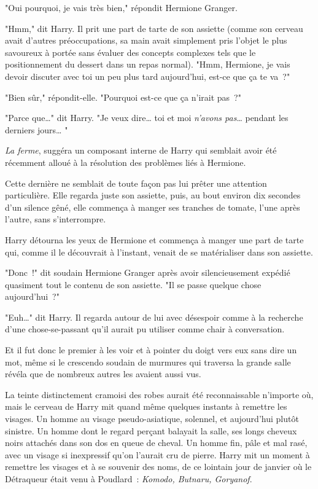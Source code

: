 "Oui pourquoi, je vais très bien," répondit Hermione Granger.

"Hmm," dit Harry. Il prit une part de tarte de son assiette (comme son cerveau avait d'autres préoccupations, sa main avait simplement pris l'objet le plus savoureux à portée sans évaluer des concepts complexes tels que le positionnement du dessert dans un repas normal). "Hmm, Hermione, je vais devoir discuter avec toi un peu plus tard aujourd'hui, est-ce que ça te va~?"

"Bien sûr," répondit-elle. "Pourquoi est-ce que ça n'irait pas~?"

"Parce que…" dit Harry. "Je veux dire… toi et moi \emph{n'avons pas}… pendant les derniers jours… "

\emph{La ferme}, suggéra un composant interne de Harry qui semblait avoir été récemment alloué à la résolution des problèmes liés à Hermione.

Cette dernière ne semblait de toute façon pas lui prêter une attention particulière. Elle regarda juste son assiette, puis, au bout environ dix secondes d'un silence gêné, elle commença à manger ses tranches de tomate, l'une après l'autre, sans s'interrompre.

Harry détourna les yeux de Hermione et commença à manger une part de tarte qui, comme il le découvrait à l'instant, venait de se matérialiser dans son assiette.

"Donc~!" dit soudain Hermione Granger après avoir silencieusement expédié quasiment tout le contenu de son assiette. "Il se passe quelque chose aujourd'hui~?"

"Euh…" dit Harry. Il regarda autour de lui avec désespoir comme à la recherche d'une chose-se-passant qu'il aurait pu utiliser comme chair à conversation.

Et il fut donc le premier à les voir et à pointer du doigt vers eux sans dire un mot, même si le crescendo soudain de murmures qui traversa la grande salle révéla que de nombreux autres les avaient aussi vus.

La teinte distinctement cramoisi des robes aurait été reconnaissable n'importe où, mais le cerveau de Harry mit quand même quelques instants à remettre les visages. Un homme au visage pseudo-asiatique, solennel, et aujourd'hui plutôt sinistre. Un homme dont le regard perçant balayait la salle, ses longs cheveux noirs attachés dans son dos en queue de cheval. Un homme fin, pâle et mal rasé, avec un visage si inexpressif qu'on l'aurait cru de pierre. Harry mit un moment à remettre les visages et à se souvenir des noms, de ce lointain jour de janvier où le Détraqueur était venu à Poudlard~: \emph{Komodo, Butnaru, Goryanof}.

